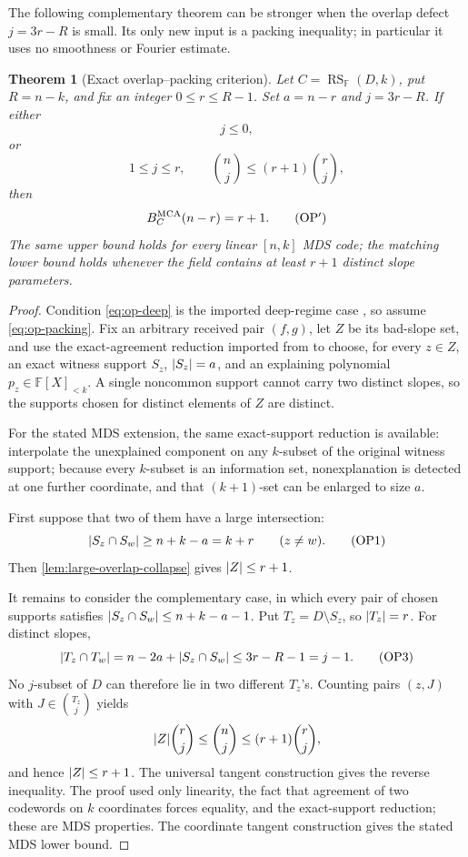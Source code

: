 \documentclass[11pt,a4paper]{amsart}
\numberwithin{equation}{section}
\newtheorem{theorem}{Theorem}[section]
\theoremstyle{remark}
\DeclareMathOperator{\RS}{RS}\DeclareMathOperator{\MCA}{MCA}\DeclareMathOperator{\CA}{CA}
\newcommand{\F}{\mathbb F}\newcommand{\B}{\mathbb B}\newcommand{\K}{\mathbb K}\newcommand{\Z}{\mathbb Z}
\begin{document}
The following complementary theorem can be stronger when the overlap
defect \(j=3r-R\) is small.  Its only new input is a packing inequality;
in particular it uses no smoothness or Fourier estimate.

\begin{theorem}[Exact overlap--packing criterion]
\label{thm:overlap-packing-exact}
Let \(C=\RS_\F(D,k)\), put \(R=n-k\), and fix an integer
\(0\le r\le R-1\).  Set \(a=n-r\) and \(j=3r-R\).  If either
\[
 j\le0,
 \tag{OP0}\label{eq:op-deep}
\]
or
\[
 1\le j\le r,
 \qquad
 \binom nj\le(r+1)\binom rj,
 \tag{OP}\label{eq:op-packing}
\]
then
\[
                    B_C^{\rm MCA}(n-r)=r+1.       \tag{OP$'$}
\label{eq:op-exact}
\]
The same upper bound holds for every linear \([n,k]\) MDS code; the
matching lower bound holds whenever the field contains at least \(r+1\)
distinct slope parameters.
\end{theorem}

\begin{proof}
Condition \eqref{eq:op-deep} is the imported deep-regime case \cite[Sec.~13]{CAP25v132}, so assume
\eqref{eq:op-packing}.  Fix an arbitrary received pair \((f,g)\), let
\(Z\) be its bad-slope set, and use the exact-agreement reduction imported from \cite[Sec.~13]{CAP25v132} to choose, for every \(z\in Z\), an
exact witness support \(S_z\), \(\lvert S_z\rvert=a\), and an explaining
polynomial \(p_z\in\F[X]_{<k}\).  A single noncommon support cannot carry
two distinct slopes, so the supports chosen for distinct elements of
\(Z\) are distinct.

For the stated MDS extension, the same exact-support reduction is
available: interpolate the unexplained component on any \(k\)-subset of
the original witness support; because every \(k\)-subset is an information
set, nonexplanation is detected at one further coordinate, and that
\((k+1)\)-set can be enlarged to size \(a\).

First suppose that two of them have a large intersection:
\[
 \lvert S_z\cap S_w\rvert\ge n+k-a=k+r
 \qquad(z\ne w).
 \tag{OP1}\label{eq:op-large-overlap}
\]
Then \cref{lem:large-overlap-collapse} gives \(\lvert Z\rvert\le r+1\).

It remains to consider the complementary case, in which every pair of
chosen supports satisfies
\(\lvert S_z\cap S_w\rvert\le n+k-a-1\).  Put
\(T_z=D\setminus S_z\), so \(\lvert T_z\rvert=r\).  For distinct slopes,
\[
 \lvert T_z\cap T_w\rvert
 =n-2a+\lvert S_z\cap S_w\rvert
 \le3r-R-1=j-1.                                  \tag{OP3}
\label{eq:op-small-overlap}
\]
No \(j\)-subset of \(D\) can therefore lie in two different \(T_z\)'s.
Counting pairs \((z,J)\) with \(J\in\binom{T_z}{j}\) yields
\[
                 \lvert Z\rvert\binom rj\le\binom nj\le
                 (r+1)\binom rj,
\]
and hence \(\lvert Z\rvert\le r+1\).  The universal tangent construction gives
the reverse inequality.  The proof used only linearity, the fact that
agreement of two codewords on \(k\) coordinates forces equality, and the
exact-support reduction; these are MDS properties.  The coordinate
tangent construction gives the stated MDS lower bound.
\end{proof}
\end{document}
